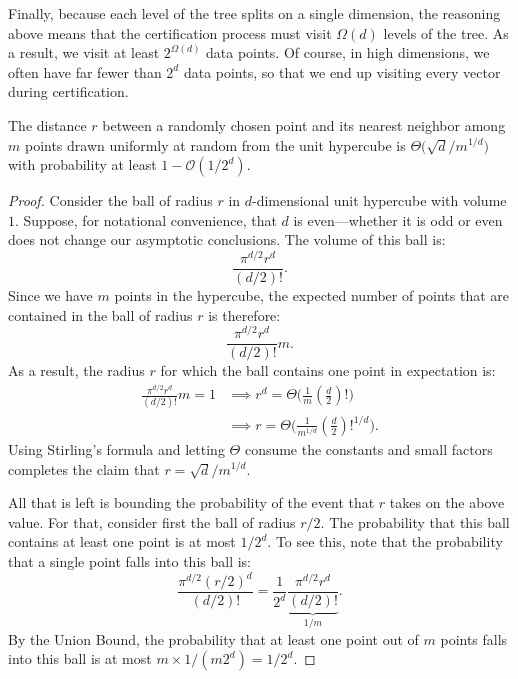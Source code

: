 Finally, because each level of the tree splits
on a single dimension, the reasoning above means that the certification process must visit
$\Omega(d)$ levels of the tree. As a result, we visit at least $2^{\Omega(d)}$ data points.
Of course, in high dimensions, we often have far fewer than $2^d$ data points,
so that we end up visiting every vector during certification.

\begin{lemma}
    \label{lemma:branch-and-bound:expected-distance}
    The distance $r$ between a randomly chosen point and its nearest neighbor among $m$ points drawn
    uniformly at random from the unit hypercube is $\Theta\big( \sqrt{d} / m^{1/d}\big)$
    with probability at least $1 - \mathcal{O}(1/2^d)$.
\end{lemma}
\begin{proof}
    Consider the ball of radius $r$ in $d$-dimensional unit hypercube with volume $1$. Suppose, for notational
    convenience, that $d$ is even---whether it is odd or even does not change our asymptotic
    conclusions. The volume of this ball is:
    \begin{equation*}
        \frac{\pi^{d/2} r^d}{(d/2)!}.
    \end{equation*}
    Since we have $m$ points in the hypercube, the expected number of points that are contained in
    the ball of radius $r$ is therefore:
    \begin{equation*}
        \frac{\pi^{d/2} r^d}{(d/2)!} m.
    \end{equation*}
    As a result, the radius $r$ for which the ball contains one point in expectation is:
    \begin{align*}
        \frac{\pi^{d/2} r^d}{(d/2)!} m = 1 &\implies r^d = \Theta\big(\frac{1}{m} (\frac{d}{2})!\big)\\
        &\implies r = \Theta\big( \frac{1}{m^{1/d}} (\frac{d}{2})!^{1/d} \big).
    \end{align*}
    Using Stirling's formula and letting $\Theta$ consume the constants and small
    factors completes the claim that $r = \sqrt{d} / m^{1/d}$.

    All that is left is bounding the probability of the event that $r$ takes on
    the above value. For that, consider first the ball of radius $r/2$.
    The probability that this ball contains at least one
    point is at most $1/2^d$. To see this, note that the probability that a single point
    falls into this ball is:
    \begin{equation*}
        \frac{\pi^{d/2} (r/2)^d}{(d/2)!} = \frac{1}{2^d} \underbrace{\frac{\pi^{d/2} r^d}{(d/2)!}}_{1/m}.
    \end{equation*}
    By the Union Bound, the probability that at least one point out of $m$ points
    falls into this ball is at most $m \times 1/(m 2^d) = 1/2^d$.


\end{proof}
